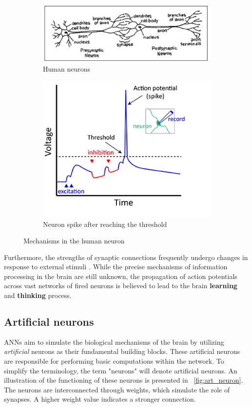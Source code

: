 \begin{figure}[h]
	\centering
	\begin{subfigure}{.5\textwidth}
		\centering
		\includegraphics[width=0.9\linewidth]{ImageFiles/NeuralNetworks/neuron}
		\caption{Human neurons}
		\label{fig:neurons}
	\end{subfigure}%
	\begin{subfigure}{.5\textwidth}
		\centering
		\includegraphics[width=0.7\linewidth]{ImageFiles/NeuralNetworks/spiking}
		\caption{Neuron spike after reaching the threshold}
		\label{fig:spking}
	\end{subfigure}
	\caption{Mechanisms in the human neuron}
\end{figure}

Furthermore, the strengths of synaptic connections frequently undergo changes in response to external stimuli \cite{aggarwal2018neural}. While the precise mechanisms of information processing in the brain are still unknown, the propagation of action potentials across vast networks of fired neurons is believed to lead to the brain \textbf{learning} and \textbf{thinking} process.

\subsection{Artificial neurons}

ANNs aim to simulate the biological mechanisms of the brain by utilizing \textit{artificial} neurons as their fundamental building blocks. These artificial neurons are responsible for performing basic computations within the network. To simplify the terminology, the term "neurons" will denote artificial neurons.
An illustration of the functioning of these neurons is presented in \Fig~\ref{fig:art_neuron}. The neurons are interconnected through weights, which simulate the role of synapses. A higher weight value indicates a stronger connection.

